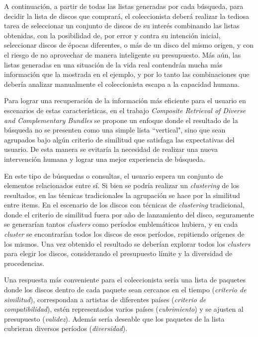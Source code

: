 A continuación, a partir de todas las listas generadas por cada búsqueda, para decidir la lista de discos que comprará, el coleccionista deberá realizar la tediosa tarea de seleccionar un conjunto de discos de su interés combinando las listas obtenidas, con la posibilidad de, por error y contra su intención inicial, seleccionar discos de  épocas diferentes, o más de un disco del mismo origen, y con el riesgo de no aprovechar de manera inteligente su presupuesto. Más aún, las listas generadas en una situación de la vida real contendrán mucha más información que la mostrada en el ejemplo, y por lo tanto las combinaciones que debería analizar manualmente el coleccionista escapa a la capacidad humana. 

Para lograr una recuperación de la información más eficiente para el usuario en escenarios de estas características, en el trabajo {\em Composite Retrieval of Diverse and Complementary Bundles} \cite{compositeRetrival} se propone un enfoque donde el resultado de la búsqueda no se presenten como una simple lista ``vertical", sino que sean agrupados bajo algún criterio de similitud que satisfaga las expectativas del usuario. De esta manera se evitaría la necesidad de realizar una nueva intervención humana y lograr una mejor experiencia de búsqueda.

En este tipo de búsquedas o consultas, el usuario espera un conjunto de elementos relacionados entre sí. Si bien se podría realizar un {\em clustering} de los resultados, en las técnicas tradicionales la agrupación se hace por la similitud entre items. En el escenario de los discos con técnicas de {\em clustering} tradicional, donde el criterio de similitud fuera por año de lanzamiento del disco, seguramente se generarían tantos {\em clusters} como períodos emblemáticos hubiera, y en cada {\em cluster} se encontrarían todos los discos de esos períodos, repitiendo orígenes de los mismos. Una vez obtenido el resultado se deberían explorar todos los {\em clusters} para elegir los discos, considerando el presupuesto límite y la diversidad de procedencias.

Una respuesta más conveniente para el coleccionista sería una lista de paquetes donde los discos dentro de cada paquete sean cercanos en el tiempo ({\em criterio de similitud}), correspondan a artistas de diferentes países ({\em criterio de compatibilidad}), estén representados varios países ({\em cubrimiento}) y se ajusten al presupuesto ({\em validez}). Además sería deseable que los paquetes de la lista cubrieran diversos períodos ({\em diversidad}).

